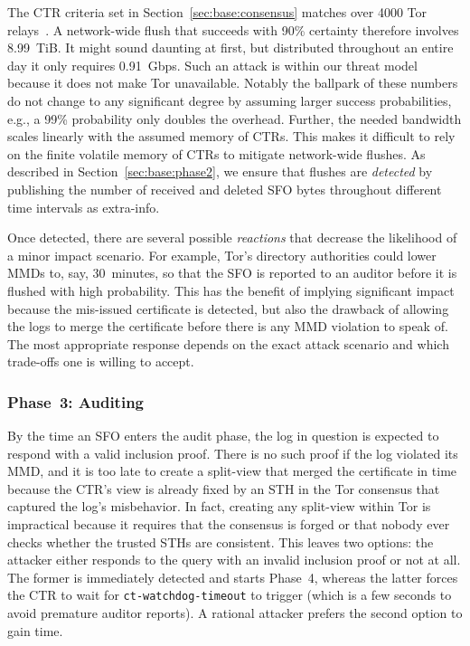 The CTR criteria set in Section~\ref{sec:base:consensus} matches over
4000 Tor relays~\cite{relay-by-flag}.  A network-wide flush that succeeds with
90\% certainty therefore involves 8.99~TiB.  It might sound daunting at first,
but distributed throughout an entire day it only requires 0.91~Gbps. Such an
attack is within our threat model because it does not make Tor unavailable.
Notably the ballpark of these numbers do not change to any significant degree by
assuming larger success probabilities, e.g., a 99\% probability only doubles the
overhead. Further, the needed bandwidth scales linearly with the assumed memory
of CTRs.  This makes it difficult to rely on the finite volatile memory of CTRs
to mitigate network-wide flushes.  As described in
Section~\ref{sec:base:phase2}, we ensure that flushes are \emph{detected} by
publishing the number of received and deleted SFO bytes throughout different
time intervals as extra-info.

Once detected, there are several possible \emph{reactions} that decrease the
likelihood of a minor impact scenario.  For example, Tor's directory
authorities could lower MMDs to, say, 30~minutes, so that the SFO is reported to
an auditor before it is flushed with high probability.  This has the benefit of
implying significant impact because the mis-issued certificate is detected, but
also the drawback of allowing the logs to merge the certificate before there is
any MMD violation to speak of.  The most appropriate response depends on the
exact attack scenario and which trade-offs one is willing to accept.

\subsubsection{Phase~3: Auditing} \label{sec:analysis:pr:phase3}
By the time an SFO enters the audit phase, the log in question is expected to
respond with a valid inclusion proof.  There is no such proof if the log
violated its MMD, and it is too late to create a split-view that merged the
certificate in time because the CTR's view is already fixed by an STH in the
Tor consensus that captured the log's misbehavior.  In fact, creating any
split-view within Tor is impractical because it requires that the consensus is
forged or that nobody ever checks whether the trusted STHs are consistent.
This leaves two options:
	the attacker either responds to the query with an invalid inclusion proof or
	not at all.
The former is immediately detected and starts Phase~4, whereas the latter forces
the CTR to wait for \texttt{ct-watchdog-timeout} to trigger (which is a
few seconds to avoid premature auditor reports).  A rational attacker prefers
the second option to gain time.

